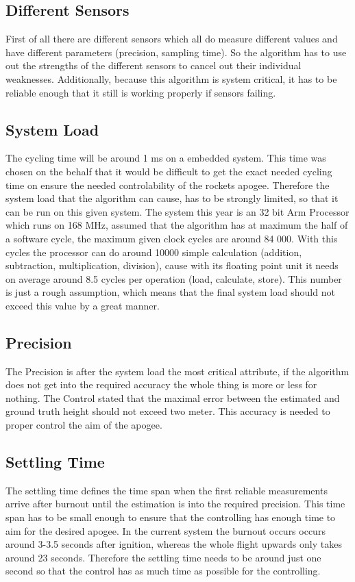  \subsection{Different Sensors}
 First of all there are different sensors which all do measure different values and have different parameters (precision, sampling time).
 So the algorithm has to use out the strengths of the different sensors to cancel out their individual weaknesses.
 Additionally, because this algorithm is system critical, it has to be reliable enough that it still is working properly if sensors failing. 
 
 \subsection{System Load}
 The cycling time will be around 1 ms on a embedded system. This time was chosen on the behalf that it would be difficult to get the exact needed cycling time on ensure the needed controlability of the rockets apogee.
 Therefore the system load that the algorithm can cause, has to be strongly limited, so that it can be run on this given system. 
 The system this year is an 32 bit Arm Processor which runs on 168 MHz, assumed that the algorithm has at maximum the half of a software cycle, the maximum given clock cycles are around 84 000.
 With this cycles the processor can do around 10000 simple calculation (addition, subtraction, multiplication, division),
 cause with its floating point unit it needs on average around 8.5 cycles per operation (load, calculate, store). 
 This number is just a rough assumption, which means that the final system load should not exceed this value by a great manner.
 
 \subsection{Precision}
 The Precision is after the system load the most critical attribute, if the algorithm does not get into the required accuracy the whole thing is more or less for nothing.
 The Control stated that the maximal error between the estimated and ground truth height should not exceed two meter. This accuracy is needed to proper control the aim of the apogee.
 
 \subsection{Settling Time}
 The settling time defines the time span when the first reliable measurements arrive after burnout until the estimation is into the required precision.
 This time span has to be small enough to ensure that the controlling has enough time to aim for the desired apogee. In the current system the burnout occurs 
 occurs around 3-3.5 seconds after ignition, whereas the whole flight upwards only takes around 23 seconds. Therefore the settling time needs to be around just
 one second so that the control has as much time as possible for the controlling.
 
